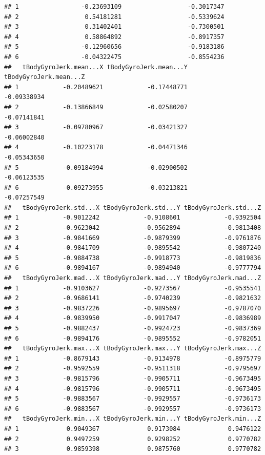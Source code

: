 \documentclass[
]{article}
\begin{document}
\begin{verbatim}
## 1                 -0.23693109                  -0.3017347
## 2                  0.54181281                  -0.5339624
## 3                  0.31402401                  -0.7300501
## 4                  0.58864892                  -0.8917357
## 5                 -0.12960656                  -0.9183186
## 6                 -0.04322475                  -0.8554236
##   tBodyGyroJerk.mean...X tBodyGyroJerk.mean...Y tBodyGyroJerk.mean...Z
## 1            -0.20489621            -0.17448771            -0.09338934
## 2            -0.13866849            -0.02580207            -0.07141841
## 3            -0.09780967            -0.03421327            -0.06002840
## 4            -0.10223178            -0.04471346            -0.05343650
## 5            -0.09184994            -0.02900502            -0.06123535
## 6            -0.09273955            -0.03213821            -0.07257549
##   tBodyGyroJerk.std...X tBodyGyroJerk.std...Y tBodyGyroJerk.std...Z
## 1            -0.9012242            -0.9108601            -0.9392504
## 2            -0.9623042            -0.9562894            -0.9813408
## 3            -0.9841669            -0.9879399            -0.9761876
## 4            -0.9841709            -0.9895542            -0.9807240
## 5            -0.9884738            -0.9918773            -0.9819836
## 6            -0.9894167            -0.9894940            -0.9777794
##   tBodyGyroJerk.mad...X tBodyGyroJerk.mad...Y tBodyGyroJerk.mad...Z
## 1            -0.9103627            -0.9273567            -0.9535541
## 2            -0.9686141            -0.9740239            -0.9821632
## 3            -0.9837226            -0.9895697            -0.9787070
## 4            -0.9839950            -0.9917047            -0.9836989
## 5            -0.9882437            -0.9924723            -0.9837369
## 6            -0.9894176            -0.9895552            -0.9782051
##   tBodyGyroJerk.max...X tBodyGyroJerk.max...Y tBodyGyroJerk.max...Z
## 1            -0.8679143            -0.9134978            -0.8975779
## 2            -0.9592559            -0.9511318            -0.9795697
## 3            -0.9815796            -0.9905711            -0.9673495
## 4            -0.9815796            -0.9905711            -0.9673495
## 5            -0.9883567            -0.9929557            -0.9736173
## 6            -0.9883567            -0.9929557            -0.9736173
##   tBodyGyroJerk.min...X tBodyGyroJerk.min...Y tBodyGyroJerk.min...Z
## 1             0.9049367             0.9173084             0.9476122
## 2             0.9497259             0.9298252             0.9770782
## 3             0.9859398             0.9875760             0.9770782

\end{verbatim}
\end{document}
